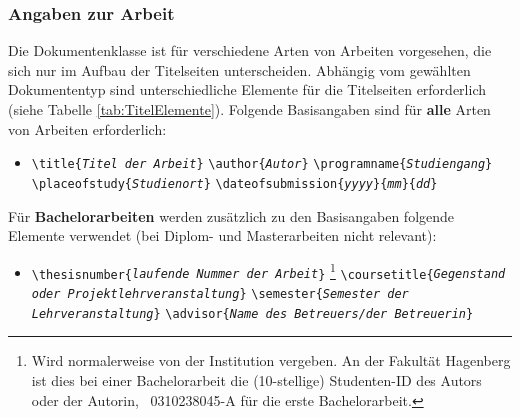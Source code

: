 \subsubsection{Angaben zur Arbeit}

Die Dokumentenklasse ist für verschiedene Arten von Arbeiten vorgesehen, die sich nur im Aufbau 
der Titelseiten unterscheiden. 
Abhängig vom gewählten Dokumententyp sind unterschiedliche Elemente für die Titelseiten erforderlich (siehe Tabelle \ref{tab:TitelElemente}).
Folgende Basisangaben sind für \textbf{alle} Arten von Arbeiten
erforderlich:
%
\begin{itemize}
\item[] %
\verb!\title{!\texttt{\em Titel der Arbeit}\verb!}! \newline%
\verb!\author{!\texttt{\em Autor}\verb!}! \newline%
\verb!\programname{!\texttt{\em Studiengang}\verb!}! \newline%
\verb!\placeofstudy{!\texttt{\em Studienort}\verb!}! \newline%
\verb!\dateofsubmission{!\texttt{\em yyyy}\verb!}{!\texttt{\em mm}\verb!}{!\texttt{\em dd}\verb!}!
\end{itemize}
%
\noindent Für \textbf{Bachelorarbeiten} werden zusätzlich zu den Basisangaben folgende Elemente verwendet (bei Diplom- und Masterarbeiten nicht relevant):
%
\begin{itemize}
\item[] \verb!\thesisnumber{!\texttt{\em laufende Nummer der Arbeit}\verb!}!%
\footnote{Wird normalerweise von der Institution vergeben. An der
Fakultät Hagenberg ist dies bei einer Bachelorarbeit die (10-stellige) Studenten-ID 
des Autors oder der Autorin,
\zB\ \textsf{0310238045-A} für die erste Bachelorarbeit.} \newline%
\verb!\coursetitle{!\texttt{\em Gegenstand oder Projektlehrveranstaltung}\verb!}! \newline%
\verb!\semester{!\texttt{\em Semester der Lehrveranstaltung}\verb!}! \newline%
\verb!\advisor{!\texttt{\em Name des Betreuers/der Betreuerin}\verb!}!
\end{itemize}

